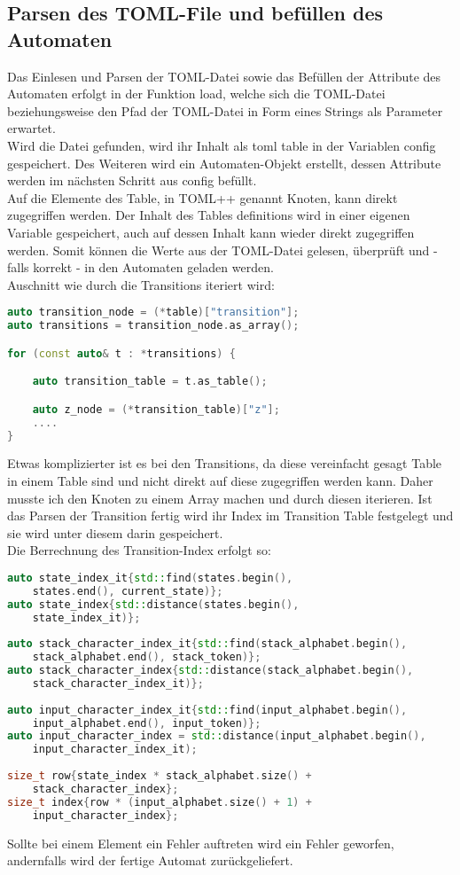 \documentclass[12pt,a4paper]{article}
\begin{document}
\subsection{Parsen des TOML-File und befüllen des Automaten}
Das Einlesen und Parsen der TOML-Datei sowie das Befüllen der Attribute des Automaten erfolgt in der Funktion load, welche sich die TOML-Datei beziehungsweise den Pfad der TOML-Datei in Form eines Strings als Parameter erwartet.
\\
\medskip
Wird die Datei gefunden, wird ihr Inhalt als toml table in der Variablen config gespeichert. Des Weiteren wird ein Automaten-Objekt erstellt, dessen Attribute werden im nächsten Schritt aus config befüllt.
\\
\medskip
Auf die Elemente des Table, in TOML++ genannt Knoten, kann direkt zugegriffen werden. Der Inhalt des Tables definitions wird in einer eigenen Variable gespeichert, auch auf dessen Inhalt kann wieder direkt zugegriffen werden. Somit können die Werte aus der TOML-Datei gelesen, überprüft und - falls korrekt - in den Automaten geladen werden.
\\
Auschnitt wie durch die Transitions iteriert wird:
\begin{lstlisting}[language=C++]
auto transition_node = (*table)["transition"];
auto transitions = transition_node.as_array();

for (const auto& t : *transitions) {

 	auto transition_table = t.as_table();

	auto z_node = (*transition_table)["z"];
	....
}

\end{lstlisting}
\medskip
Etwas komplizierter ist es bei den Transitions, da diese vereinfacht gesagt Table in einem Table sind und nicht direkt auf diese zugegriffen werden kann. Daher musste ich den Knoten zu einem Array machen und durch diesen iterieren. Ist das Parsen der Transition fertig wird ihr Index im Transition Table festgelegt und sie wird unter diesem darin gespeichert.
\\
Die Berrechnung des Transition-Index erfolgt so:
\begin{lstlisting}[language=C++]
auto state_index_it{std::find(states.begin(), 
	states.end(), current_state)};
auto state_index{std::distance(states.begin(), 
	state_index_it)};
	
auto stack_character_index_it{std::find(stack_alphabet.begin(), 
	stack_alphabet.end(), stack_token)};
auto stack_character_index{std::distance(stack_alphabet.begin(), 
	stack_character_index_it)};
	
auto input_character_index_it{std::find(input_alphabet.begin(), 
	input_alphabet.end(), input_token)};
auto input_character_index = std::distance(input_alphabet.begin(), 
	input_character_index_it);
	
size_t row{state_index * stack_alphabet.size() + 
	stack_character_index};
size_t index{row * (input_alphabet.size() + 1) + 
	input_character_index};
\end{lstlisting}
\medskip
Sollte bei einem Element ein Fehler auftreten wird ein Fehler geworfen, andernfalls wird der fertige Automat zurückgeliefert.
\end{document}
